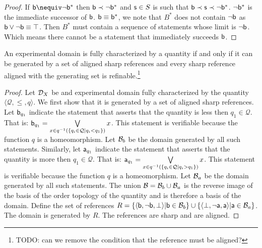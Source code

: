 \documentclass[11pt,letterpaper,fleqn]{memoir} %
\begin{document}
\begin{mathSection}
\begin{proof}
	If $\stmt[b] \nequiv \NOT \stmt[b]^*$ then $\stmt[b] \snarrower \NOT \stmt[b]^*$ and $\stmt[s] \in S$ is such that $\stmt[b] \snarrower \stmt[s] \snarrower \NOT \stmt[b]^*$. $\NOT \stmt[b]^*$ is the immediate successor of $\stmt[b]$. $\stmt[b] \equiv \stmt[b]^*$, we note that $B^*$ does not contain $\NOT \stmt[b]$ as $\stmt[b] \OR \NOT \stmt[b] \equiv \tautology$. Then $B^*$ must contain a sequence of statements whose limit is $\NOT \stmt[b]$. Which means there cannot be a statement that immediately succeeds $\stmt[b]$.
\end{proof}
 \begin{thrm}
 	An experimental domain is fully characterized by a quantity if and only if it can be generated by a set of aligned sharp references and every sharp reference aligned with the generating set is refinable.\footnote{TODO: can we remove the condition that the reference must be aligned?}
 \end{thrm}
\begin{proof}
	Let $\edomain_X$ be and experimental domain fully characterized by the quantity $\langle \mathcal{Q}, \leq, q \rangle$. We first show that it is generated by a set of aligned sharp references. Let $\stmt[b]_{q_1}$ indicate the statement that asserts that the quantity is less then $q_1 \in \mathcal{Q}$. That is: $\stmt[b]_{q_1} = \bigOR\limits_{x \in q^{-1}(\{q_i \in \mathcal{Q} | q_i < q_1\})} x$. This statement is verifiable because the function $q$ is a homeomorphism. Let $\basis_{b}$ be the domain generated by all such statements. Similarly, let $\stmt[a]_{q_1}$ indicate the statement that asserts that the quantity is more then $q_1 \in \mathcal{Q}$. That is: $\stmt[a]_{q_1} = \bigOR\limits_{x \in q^{-1}(\{q_i \in \mathcal{Q} | q_i > q_1\})} x$. This statement is verifiable because the function $q$ is a homeomorphism. Let $\basis_{a}$ be the domain generated by all such statements. The union $\basis = \basis_{b} \cup \basis_{a}$ is the reverse image of the basis of the order topology of the quantity and is therefore a basis of the domain. Define the set of references $R = \{\langle \stmt[b], \NOT \stmt[b] , \contradiction \rangle | \stmt[b] \in \basis_{b} \} \cup \{\langle \contradiction, \NOT \stmt[a] , \stmt[a] \rangle | \stmt[a] \in \basis_{a} \}$. The domain is generated by $R$. The references are sharp and are aligned.
	

\end{proof}
\end{mathSection}
\end{document}
